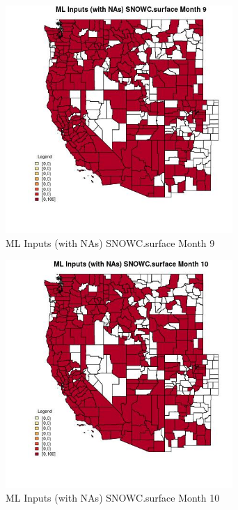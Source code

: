 \begin{figure} 
\centering  
\includegraphics[width=0.77\textwidth]{Code_Outputs/Report_ML_input_PM25_Step4_part_e_de_duplicated_aves_compiled_2019-05-21wNAs_CountySNOWCsurfacemedianMonth9.jpg} 
\caption{\label{fig:Report_ML_input_PM25_Step4_part_e_de_duplicated_aves_compiled_2019-05-21wNAsCountySNOWCsurfacemedianMonth9}ML Inputs (with NAs) SNOWC.surface Month 9} 
\end{figure} 
 

\begin{figure} 
\centering  
\includegraphics[width=0.77\textwidth]{Code_Outputs/Report_ML_input_PM25_Step4_part_e_de_duplicated_aves_compiled_2019-05-21wNAs_CountySNOWCsurfacemedianMonth10.jpg} 
\caption{\label{fig:Report_ML_input_PM25_Step4_part_e_de_duplicated_aves_compiled_2019-05-21wNAsCountySNOWCsurfacemedianMonth10}ML Inputs (with NAs) SNOWC.surface Month 10} 
\end{figure} 
 

